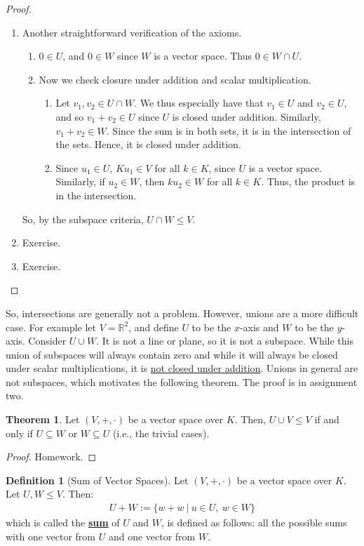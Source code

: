 \documentclass[11pt]{scrartcl}
\newcommand{\R}[0]{\mathbb{R}}
\theoremstyle{definition}
\newtheorem{theorem}{Theorem}
\newtheorem{definition}{Definition}
\theoremstyle{remark}
\newcommand{\dfn}[1]{\textbf{\underline{#1}}}
\newcommand{\vsok}[0]{Let $(V, +, \cdot)$ be a vector space over $K$}
\begin{document}
\begin{proof}
	\begin{enumerate}[noitemsep]
		\item Another straightforward verification of the axioms. 
		\begin{enumerate}[noitemsep]
			\item $0 \in U$, and $0 \in W$ since $W$ is a vector space. Thus $0 \in W \cap U$. 
			\item Now we check closure under addition and scalar multiplication.  
			\begin{enumerate}[noitemsep]
				\item Let $v_1, v_2 \in U \cap W$. We thus especially have that $v_1 \in U$ and $v_2 \in U$, and so $v_1 + v_2 \in U$ since $U$ is closed under addition. Similarly, $v_1 + v_2 \in W$. Since the sum is in both sets, it is in the intersection of the sets. Hence, it is closed under addition. 
				\item Since $u_1 \in U$, $K u_1 \in V$ for all $k \in K$, since $U$ is a vector space. Similarly, if $u_2 \in W$, then $k u_2 \in W$ for all $k \in K$. Thus, the product is in the intersection. 
			\end{enumerate}
		\end{enumerate}
		So, by the subspace criteria, $U \cap W \leq V$. 
		\item Exercise. 
		\item Exercise. 
	\end{enumerate}
\end{proof}

So, intersections are generally not a problem. However, unions are a more difficult case. For example let $V = \R^2$, and define $U$ to be the $x$-axis and $W$ to be the $y$-axis. Consider $U \cup W$. It is not a line or plane, so it is not a subspace. While this union of subspaces will always contain zero and while it will always be closed under scalar multiplications, it is \underline{not closed under addition}. Unions in general are not subspaces, which motivates the following theorem. The proof is in assignment two. 

\begin{theorem}
	\vsok. Then, $U \cup V \leq V$ if and only if $U \subseteq W$ or $W \subseteq U$ (i.e., the trivial cases). 
\end{theorem} 
\begin{proof}
	Homework. 
\end{proof}

\begin{definition}[Sum of Vector Spaces]
	\vsok. Let $U, W \leq V$. Then: 
	\begin{align*}
		U + W := \{ w + w\ |\ u \in U,\ w \in W \} 
	\end{align*}
	which is called the \dfn{sum} of $U$ and $W$, is defined as follows: all the possible sums with one vector from $U$ and one vector from $W$. 
\end{definition}
\end{document}
